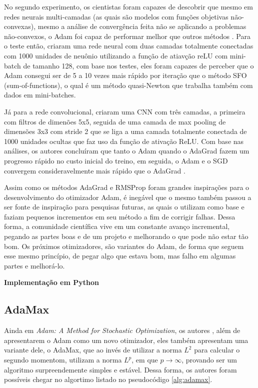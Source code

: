 No segundo experimento, os cientistas foram capazes de descobrir que mesmo em redes neurais multi-camadas (as quais são modelos com funções objetivas não-convexas), mesmo a análise de convergência feita não se aplicando a problemas não-convexos, o Adam foi capaz de performar melhor que outros métodos \parencite{AdamMethod}. Para o teste então, \textcite{AdamMethod} criaram uma rede neural com duas camadas totalmente conectadas com 1000 unidades de neuônio utilizando a função de atiavção reLU com mini-batch de tamanho 128, com base nos testes, eles foram capazes de perceber que o Adam consegui ser de 5 a 10 vezes mais rápido por iteração que o método SFO (sum-of-functions), o qual é um método quasi-Newton que trabalha também com dados em mini-batches.

Já para a rede convolucional, \textcite{AdamMethod} criaram uma CNN com três camadas, a primeira com filtros de dimenões 5x5, seguida de uma camada de max pooling de dimensões 3x3 com stride 2 que se liga a uma camada totalmente conectada de 1000 unidades ocultas que faz uso da função de ativação ReLU. Com base nas análises, os autores concluíram que tanto o Adam quando o AdaGrad fazem um progresso rápido no custo inicial do treino, em seguida, o Adam e o SGD convergem consideravelmente mais rápido que o AdaGrad \parencite{AdamMethod}.

Assim como os métodos AdaGrad e RMSProp foram grandes inspirações para o desenvolvimento do otimizador Adam, é inegável que o mesmo também passou a ser fonte de inspiração para pesquisas futuras, as quais o utilizam como base e faziam pequenos incrementos em seu método a fim de corrigir falhas. Dessa forma, a comunidade científica vive em um constante avanço incremental, pegando as partes boas e de um projeto e melhorando o que pode não estar tão bom. Os próximos otimizadores, são variantes do Adam, de forma que seguem esse mesmo princípio, de pegar algo que estava bom, mas falho em algumas partes e melhorá-lo.

\textbf{Implementação em Python}

\subsection{AdaMax}

Ainda em \textit{Adam: A Method for Stochastic Optimization}, os autores \textcite{AdamMethod}, além de apresentarem o Adam como um novo otimizador, eles também apresentam uma variante dele, o AdaMax, que ao invés de utilizar a norma $L^2$ para calcular o segundo momentom, utilizam a norma $L^p$, em que $p \to \infty$, provando ser um algoritmo surpreendemente simples e estável. Dessa forma, os autores foram possíveis chegar no algortimo listado no pseudocódigo \ref{alg:adamax}.

